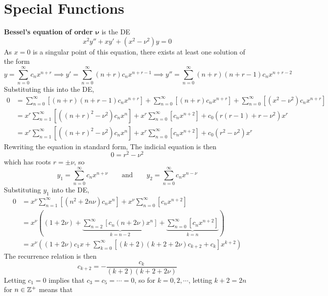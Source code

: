 \documentclass[./Differential Equations.tex]{subfiles}
\begin{document}
	\section{Special Functions}
			\textbf{Bessel's equation of order \(\bm{\nu}\)} is the DE
				\[x^2y'' + xy' + \left(x^2 - \nu^2\right)y = 0\]
				As \(x = 0\) is a singular point of this equation, there exists at least one solution of the form
				\[
					y = \sum_{n = 0}^\infty c_nx^{n + r} \implies
						y' = \sum_{n = 0}^\infty (n + r)c_nx^{n + r - 1} \implies
						y'' = \sum_{n = 0}^\infty (n + r)(n + r - 1)c_nx^{n + r - 2}
				\]
				Substituting this into the DE,
				\begin{align*}
					0 &= \sum_{n = 0}^\infty\left[(n + r)(n + r - 1)c_nx^{n + r}\right] + \sum_{n = 0}^\infty\left[(n + r)c_nx^{n + r}\right] + \sum_{n = 0}^\infty\left[\left(x^2 - \nu^2\right)c_nx^{n + r}\right] \\
						&= x^r\sum_{n = 1}^\infty\left[\left((n + r)^2 - \nu^2\right)c_nx^n\right] + x^r\sum_{n = 0}^\infty\left[c_nx^{n + 2}\right] + c_0\left(r(r - 1) + r - \nu^2\right)x^r \\
						&= x^r\sum_{n = 1}^\infty\left[\left((n + r)^2 - \nu^2\right)c_nx^n\right] + x^r\sum_{n = 0}^\infty\left[c_nx^{n + 2}\right] + c_0\left(r^2 - \nu^2\right)x^r
				\end{align*}
				Rewriting the equation in standard form,
				The indicial equation is then
				\[0 = r^2 - \nu^2\]
				which has roots \(r = \pm\nu\), so
				\[
					y_1 = \sum_{n = 0}^\infty c_nx^{n + \nu} \qquad \text{and} \qquad
					y_2 = \sum_{n = 0}^\infty c_nx^{n - \nu}
				\]
				Substituting \(y_1\) into the DE,
				\begin{align*}
					0 &= x^\nu\sum_{n = 1}^\infty\left[\left(n^2 + 2n\nu\right)c_nx^n\right] + x^\nu\sum_{n = 0}^\infty\left[c_nx^{n + 2}\right] \\
						&= x^\nu\left((1 + 2\nu) + \underset{k = n - 2}{\underbrace{\sum_{n = 2}^\infty\left[c_n(n + 2\nu)x^n\right]}} + \underset{k = n}{\underbrace{\sum_{n = 0}^\infty\left[c_nx^{n + 2}\right]}}\right) \\
						&= x^\nu\left((1 + 2\nu)c_1x + \sum_{k = 0}^\infty\left[(k + 2)(k + 2 + 2\nu)c_{k + 2} + c_k\right]x^{k + 2}\right)
				\end{align*}
				The recurrence relation is then
				\[c_{k + 2} = -\frac{c_k}{(k + 2)(k + 2 + 2\nu)}\]
				Letting \(c_1 = 0\) implies that \(c_3 = c_5 = \cdots = 0\), so for \(k = 0, 2, \cdots\), letting \(k + 2 = 2n\) for \(n \in \mathbb{Z}^+\) means that
\end{document}
